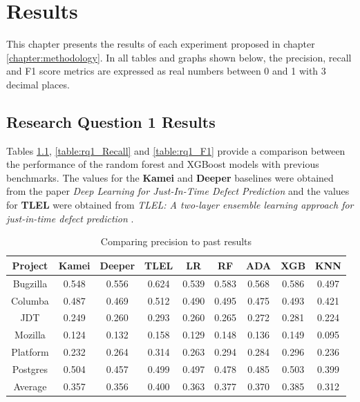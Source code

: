 \documentclass[../main.tex]{subfiles}
\begin{document}
\chapter{Results} \label{chapter:results}

This chapter presents the results of each experiment proposed in chapter \ref{chapter:methodology}. In all tables and graphs shown below, the precision, recall and F1 score metrics are expressed as real numbers between 0 and 1 with 3 decimal places.

\section{Research Question 1 Results}

Tables \ref{table:rq1_Precision}, \ref{table:rq1_Recall} and \ref{table:rq1_F1} provide a comparison between the performance of the  random forest and XGBoost models with previous benchmarks. The values for the \textbf{Kamei} and \textbf{Deeper} baselines were obtained from the paper \textit{Deep Learning for Just-In-Time Defect Prediction} \cite{yang2015deep} and the values for \textbf{TLEL} were obtained from \textit{TLEL: A two-layer ensemble learning approach for just-in-time defect prediction} \cite{yang2017tlel}.

\begin{table}[H] 
\centering 
\caption{Comparing precision to past results} 
\begin{tabular}{|c c c c c c c c c|} 
\hline 
Project  & Kamei& Deeper & TLEL  & LR & RF   & ADA    & XGB & KNN \\ 
\hline \hline 
Bugzilla & 0.548 & 0.556 & 0.624 & 0.539  & 0.583 & 0.568 & 0.586  & 0.497    \\ 
\hline 
Columba  & 0.487 & 0.469 & 0.512 & 0.490  &0.495  & 0.475 & 0.493  & 0.421  \\ 
\hline 
JDT      & 0.249 & 0.260 & 0.293 & 0.260  & 0.265 & 0.272 & 0.281  & 0.224     \\ 
\hline 
Mozilla  & 0.124 & 0.132 & 0.158 & 0.129  &0.148  & 0.136 & 0.149  & 0.095 \\ 
\hline 
Platform & 0.232 & 0.264 & 0.314 &  0.263  &0.294  & 0.284 & 0.296  & 0.236    \\ 
\hline 
Postgres & 0.504 & 0.457 & 0.499 & 0.497  &0.478  & 0.485 & 0.503  & 0.399     \\ 
\hline 
Average  & 0.357 & 0.356 & 0.400 & 0.363  & 0.377     &  0.370      & 0.385  &  0.312    \\ 
\hline 
\end{tabular} 
\label{table:rq1_Precision} 
\end{table} 
\end{document}
